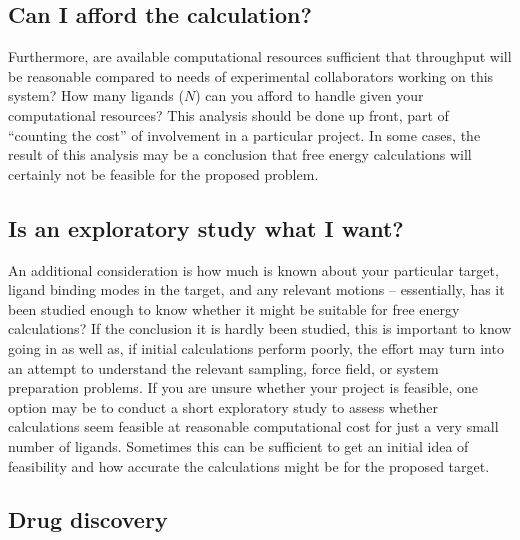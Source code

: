 \documentclass[9pt,bestpractices]{livecoms}
\begin{document}
\subsection*{Can I afford the calculation?}
Furthermore, are
available computational resources sufficient that throughput will be
reasonable compared to needs of experimental collaborators working on
this system? How many ligands ($N$) can you afford to handle given
your computational resources?
This analysis should be done up front, part of ``counting the cost''
of involvement in a particular project. In some cases, the result of
this analysis may be a conclusion that free energy calculations will
certainly not be feasible for the proposed problem.
%
\subsection*{Is an exploratory study what I want?}
An additional consideration is how much is known about your particular
target, ligand binding modes in the target, and any relevant motions
-- essentially, has it been studied enough to know whether it might be
suitable for free energy calculations? If the conclusion it is hardly
been studied, this is important to know going in as well as, if
initial calculations perform poorly, the effort may turn into an
attempt to understand the relevant sampling, force field, or system
preparation problems.
%
If you are unsure whether your project is feasible, one option may be
to conduct a short exploratory study to assess whether calculations
seem feasible at reasonable computational cost for just a very small
number of ligands. Sometimes this can be sufficient to get an initial
idea of feasibility and how accurate the calculations might be for the
proposed target.

\subsection*{Drug discovery}

\end{document}
